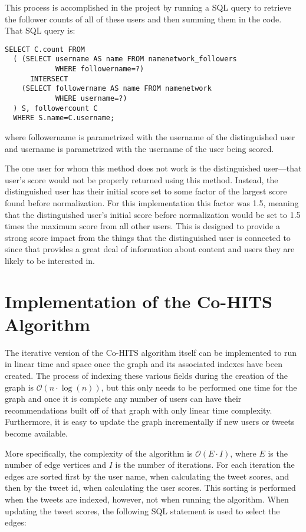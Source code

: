 This process is accomplished in the project by running a SQL query to retrieve the follower counts of all of these users and then summing them in the code. That SQL query is:

\begin{verbatim}
SELECT C.count FROM
  ( (SELECT username AS name FROM namenetwork_followers
            WHERE followername=?)
      INTERSECT
    (SELECT followername AS name FROM namenetwork
            WHERE username=?)
  ) S, followercount C
  WHERE S.name=C.username;
\end{verbatim}

\noindent
where followername is parametrized with the username of the distinguished user and username is parametrized with the username of the user being scored.

The one user for whom this method does not work is the distinguished user---that user's score would not be properly returned using this method. Instead, the distinguished user has their initial score set to some factor of the largest score found before normalization. For this implementation this factor was 1.5, meaning that the distinguished user's initial score before normalization would be set to 1.5 times the maximum score from all other users. This is designed to provide a strong score impact from the things that the distinguished user is connected to since that provides a great deal of information about content and users they are likely to be interested in.


\section{Implementation of the Co-HITS Algorithm}


The iterative version of the Co-HITS algorithm itself can be implemented to run in linear time and space once the graph and its associated indexes have been created. The process of indexing these various fields during the creation of the graph is $\mathcal{O}(n \cdot \log(n))$, but this only needs to be performed one time for the graph and once it is complete any number of users can have their recommendations built off of that graph with only linear time complexity. Furthermore, it is easy to update the graph incrementally if new users or tweets become available.

More specifically, the complexity of the algorithm is $\mathcal{O}(E \cdot I)$, where $E$ is the number of edge vertices and $I$ is the number of iterations. For each iteration the edges are sorted first by the user name, when calculating the tweet scores, and then by the tweet id, when calculating the user scores. This sorting is performed when the tweets are indexed, however, not when running the algorithm. When updating the tweet scores, the following SQL statement is used to select the edges:


